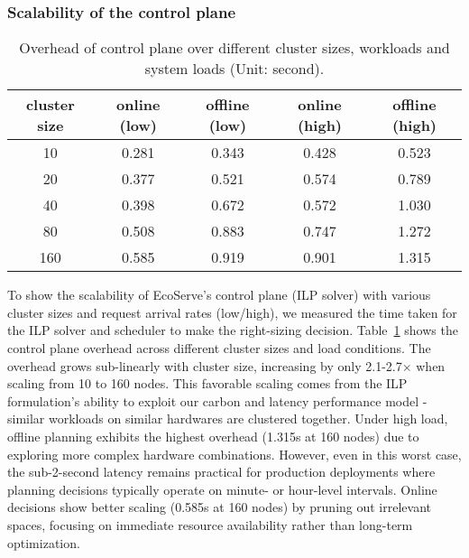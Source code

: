 \subsubsection{Scalability of the control plane}
\begin{table}[b]\footnotesize
    \centering
    \begin{tabular}{ccccc}\hline
        cluster size & online (low) & offline (low)  & online (high) & offline (high) \\ \hline
        10  & 0.281 & 0.343 & 0.428 & 0.523 \\
        20  & 0.377 & 0.521  & 0.574 & 0.789 \\
        40  & 0.398 & 0.672  & 0.572 & 1.030\\
        80  & 0.508 & 0.883  & 0.747 & 1.272 \\
        160 & 0.585 & 0.919  & 0.901 & 1.315\\\hline
    \end{tabular}
    \caption{Overhead of control plane over different cluster sizes, workloads and system loads (Unit: second).}
    \label{tab:scalability} \hspace{-1in}
\end{table}
To show the scalability of EcoServe's control plane (ILP solver) with various cluster sizes and request arrival rates (low/high), we measured the time taken for the ILP solver and scheduler to make the right-sizing decision. 
Table~\ref{tab:scalability} shows the control plane overhead across different cluster sizes and load conditions. The overhead grows sub-linearly with cluster size, increasing by only 2.1-2.7$\times$ when scaling from 10 to 160 nodes. This favorable scaling comes from the ILP formulation's ability to exploit our carbon and latency performance model - similar workloads on similar hardwares are clustered together. Under high load, offline planning exhibits the highest overhead (1.315s at 160 nodes) due to exploring more complex hardware combinations. However, even in this worst case, the sub-2-second latency remains practical for production deployments where planning decisions typically operate on minute- or hour-level intervals. Online decisions show better scaling (0.585s at 160 nodes) by pruning out irrelevant spaces, focusing on immediate resource availability rather than long-term optimization.








    
    
